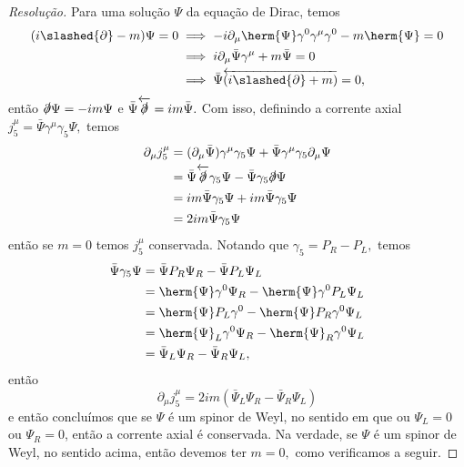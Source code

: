 \begin{proof}[Resolução]
    Para uma solução \(\Psi\) da equação de Dirac, temos
    \begin{align*}
        (i \slashed{\partial} - m) \Psi = 0 &\implies -i \partial_\mu \herm{\Psi} \gamma^0\gamma^\mu\gamma^0 - m \herm{\Psi} = 0\\
                                            &\implies i \partial_\mu \bar{\Psi} \gamma^\mu + m \bar{\Psi} = 0\\
                                            &\implies \bar{\Psi}\overleftarrow{(i \slashed{\partial} + m)} = 0,
    \end{align*}
    então \(\slashed{\partial} \Psi = -im \Psi\) e \(\bar{\Psi} \overleftarrow{\slashed{\partial}} = i m \bar{\Psi}.\) Com isso, definindo a corrente axial \(j_5^\mu = \bar{\Psi} \gamma^\mu \gamma_5 \Psi,\) temos
    \begin{align*}
        \partial_\mu j_5^\mu &= (\partial_\mu \bar{\Psi}) \gamma^\mu \gamma_5 \Psi + \bar{\Psi} \gamma^\mu \gamma_5 \partial_\mu \Psi\\
                             &= \bar{\Psi} \overleftarrow{\slashed{\partial}} \gamma_5 \Psi - \bar{\Psi} \gamma_5 \slashed{\partial} \Psi\\
                             &= i m \bar{\Psi} \gamma_5 \Psi + i m \bar{\Psi} \gamma_5 \Psi\\
                             &= 2im \bar{\Psi} \gamma_5 \Psi
    \end{align*}
    então se \(m = 0\) temos \(j_5^\mu\) conservada. Notando que \(\gamma_5 = P_R - P_L,\) temos
    \begin{align*}
        \bar{\Psi} \gamma_5 \Psi &= \bar{\Psi} P_R\Psi_R - \bar{\Psi} P_L \Psi_L\\
                                 &= \herm{\Psi} \gamma^0 \Psi_R - \herm{\Psi}\gamma^0 P_L \Psi_L\\
                                 &= \herm{\Psi} P_L \gamma^0 - \herm{\Psi} P_R \gamma^0 \Psi_L\\
                                 &= \herm{\Psi}_L \gamma^0 \Psi_R - \herm{\Psi}_R \gamma^0 \Psi_L\\
                                 &= \bar{\Psi}_L \Psi_R - \bar{\Psi}_R \Psi_L,
    \end{align*}
    então
    \begin{equation*}
        \partial_\mu j_5^\mu = 2im \left(\bar{\Psi}_L \Psi_R - \bar{\Psi}_R \Psi_L\right)
    \end{equation*}
    e então concluímos que se \(\Psi\) é um spinor de Weyl, no sentido em que ou \(\Psi_L = 0\) ou \(\Psi_R = 0\), então a corrente axial é conservada. Na verdade, se \(\Psi\) é um spinor de Weyl, no sentido acima, então devemos ter \(m = 0,\) como verificamos a seguir.


\end{proof}
